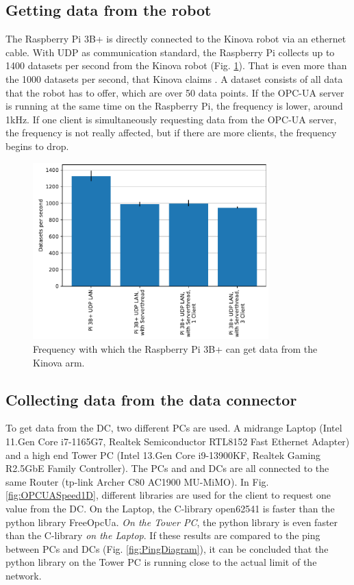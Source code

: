 \documentclass[conference]{IEEEtran}
\begin{document}
\subsection{Getting data from the robot}
The Raspberry Pi 3B+ is directly connected to the Kinova robot via an ethernet cable.
With UDP as communication standard, the Raspberry Pi collects  up to 1400 datasets per second from the Kinova robot (Fig. \ref{fig:KortexAPISpeed}).
That is even more than the 1000 datasets per second, that Kinova claims \cite{KortexUDP}. A dataset consists of all  data that the robot has to offer, which are over 50 data points.
If the OPC-UA server is running at the same time on the Raspberry Pi, the frequency is lower, around 1kHz.
If one client is simultaneously requesting data from the OPC-UA server, the frequency is not really affected, but if there are more clients, the frequency begins to drop.

\begin{figure}[htbp]
    \centerline{\includegraphics[width=9.1cm]{Pictures/KortexAPISpeed.pdf}}
    \caption{Frequency with which the Raspberry Pi 3B+ can get data from the Kinova arm.}
    \label{fig:KortexAPISpeed}
\end{figure}

\subsection{ Collecting data from the data connector}
To get  data from the DC, two different PCs are used. A midrange Laptop (Intel 11.Gen Core i7-1165G7, Realtek Semiconductor
RTL8152 Fast Ethernet Adapter) and a high end Tower PC (Intel 13.Gen Core i9-13900KF, Realtek Gaming R2.5GbE Family Controller).
The PCs and and DCs are all connected to the same Router (tp-link Archer C80 AC1900 MU-MiMO). In Fig. \ref{fig:OPCUASpeed1D}, different libraries are used for the client to request one value from the DC.
On the Laptop, the C-library open62541 is faster than the python library FreeOpcUa.
\textit{On the Tower PC}, the python library is even faster than the C-library \textit{on the Laptop}.
If these results are compared to the ping between  PCs and DCs (Fig. \ref{fig:PingDiagram}), it can be concluded that the python library on the Tower PC is running close to the actual limit of the network.\\
\end{document}
